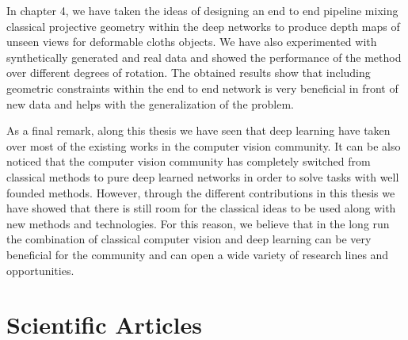 In chapter 4, we have taken the ideas of designing an end to end pipeline mixing classical projective geometry within the deep networks to produce depth maps of unseen views for deformable cloths objects. We have also experimented with synthetically generated and real data and showed the performance of the method over different degrees of rotation. The obtained results show that including geometric constraints within the end to end network is very beneficial in front of new data and helps with the generalization of the problem.

As a final remark, along this thesis we have seen that deep learning have taken over most of the existing works in the computer vision community. It can be also noticed that the computer vision community has completely switched from classical methods to pure deep learned networks in order to solve tasks with well founded methods. However, through the different contributions in this thesis we have showed that there is still room for the classical ideas to be used along with new methods and technologies. For this reason, we believe that in the long run the combination of classical computer vision and deep learning can be very beneficial for the community and can open a wide variety of research lines and opportunities.

\section{Scientific Articles}

